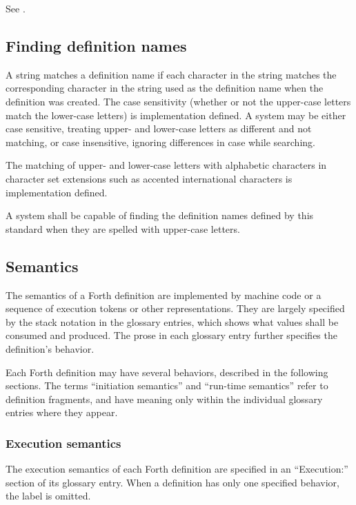 See .

\subsection{Finding definition names} %
\label{usage:find}

A string matches a definition name if each character in the string
matches the corresponding character in the string used as the
definition name when the definition was created. The case
sensitivity (whether or not the upper-case letters match the
lower-case letters) is implementation defined. A system may be
either case sensitive, treating upper- and lower-case letters as
different and not matching, or case insensitive, ignoring
differences in case while searching.

The matching of upper- and lower-case letters with alphabetic
characters in character set extensions such as accented
international characters is implementation defined.

A system shall be capable of finding the definition names defined
by this standard when they are spelled with upper-case letters.


\subsection{Semantics} %
\label{usage:semantics}

The semantics of a Forth definition are implemented by machine code
or a sequence of execution tokens or other representations. They are
largely specified by the stack notation in the glossary entries,
which shows what values shall be consumed and produced. The prose in
each glossary entry further specifies the definition's behavior.

Each Forth definition may have several behaviors, described in the
following sections. The terms ``initiation semantics'' and
``run-time semantics'' refer to definition fragments, and have
meaning only within the individual glossary entries where they
appear.

\subsubsection{Execution semantics} %

The execution semantics of each Forth definition are specified in an
``\textsf{Execution:}'' section of its glossary entry. When a
definition has only one specified behavior, the label is omitted.

